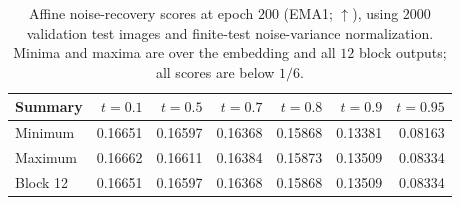 \begin{table}[H]
\centering
\caption{Affine noise-recovery scores at epoch $200$ (EMA1; $\uparrow$), using $2000$ validation test images and finite-test noise-variance normalization. Minima and maxima are over the embedding and all $12$ block outputs; all scores are below $1/6$.}
\label{tab:exp-probe-200-predeps}
\small
\begin{tabular}{lrrrrrr}
\toprule
Summary & $t=0.1$ & $t=0.5$ & $t=0.7$ & $t=0.8$ & $t=0.9$ & $t=0.95$\\
\midrule
Minimum & 0.16651 & 0.16597 & 0.16368 & 0.15868 & 0.13381 & 0.08163\\
Maximum & 0.16662 & 0.16611 & 0.16384 & 0.15873 & 0.13509 & 0.08334\\
Block 12 & 0.16651 & 0.16597 & 0.16368 & 0.15868 & 0.13509 & 0.08334\\
\bottomrule
\end{tabular}
\end{table}
